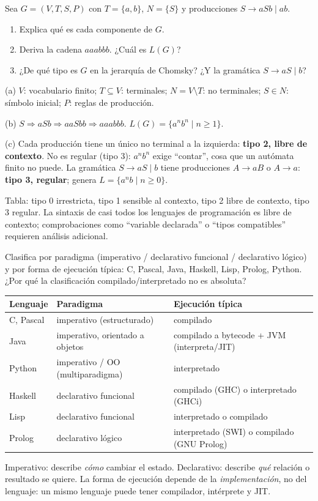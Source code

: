 \begin{prob}
Sea $G=(V,T,S,P)$ con $T=\{a,b\}$, $N=\{S\}$ y producciones $S\to aSb\mid ab$.
\begin{enumerate}[label=(\alph*)]
\item Explica qué es cada componente de $G$.
\item Deriva la cadena $aaabbb$. ¿Cuál es $L(G)$?
\item ¿De qué tipo es $G$ en la jerarquía de Chomsky? ¿Y la gramática $S\to aS\mid b$?
\end{enumerate}
\end{prob}
\begin{sol}
(a) $V$: vocabulario finito; $T\subseteq V$: terminales; $N=V\setminus T$: no terminales; $S\in N$: símbolo inicial; $P$: reglas de producción.

(b) $S\Rightarrow aSb\Rightarrow aaSbb\Rightarrow aaabbb$. \quad $L(G)=\{a^nb^n\mid n\ge1\}$.

(c) Cada producción tiene un único no terminal a la izquierda: \textbf{tipo 2, libre de contexto}. No es regular (tipo 3): $a^nb^n$ exige ``contar'', cosa que un autómata finito no puede. La gramática $S\to aS\mid b$ tiene producciones $A\to aB$ o $A\to a$: \textbf{tipo 3, regular}; genera $L=\{a^nb\mid n\ge0\}$.

Tabla: tipo 0 irrestricta, tipo 1 sensible al contexto, tipo 2 libre de contexto, tipo 3 regular. La sintaxis de casi todos los lenguajes de programación es libre de contexto; comprobaciones como ``variable declarada'' o ``tipos compatibles'' requieren análisis adicional.
\end{sol}

\begin{prob}
Clasifica por paradigma (imperativo / declarativo funcional / declarativo lógico) y por forma de ejecución típica: C, Pascal, Java, Haskell, Lisp, Prolog, Python. ¿Por qué la clasificación compilado/interpretado no es absoluta?
\end{prob}
\begin{sol}
\begin{tabular}{@{}lll@{}}
\toprule Lenguaje & Paradigma & Ejecución típica\\\midrule
C, Pascal & imperativo (estructurado) & compilado\\
Java & imperativo, orientado a objetos & compilado a bytecode + JVM (interpreta/JIT)\\
Python & imperativo / OO (multiparadigma) & interpretado\\
Haskell & declarativo funcional & compilado (GHC) o interpretado (GHCi)\\
Lisp & declarativo funcional & interpretado o compilado\\
Prolog & declarativo lógico & interpretado (SWI) o compilado (GNU Prolog)\\\bottomrule
\end{tabular}

Imperativo: describe \emph{cómo} cambiar el estado. Declarativo: describe \emph{qué} relación o resultado se quiere. La forma de ejecución depende de la \emph{implementación}, no del lenguaje: un mismo lenguaje puede tener compilador, intérprete y JIT.
\end{sol}

